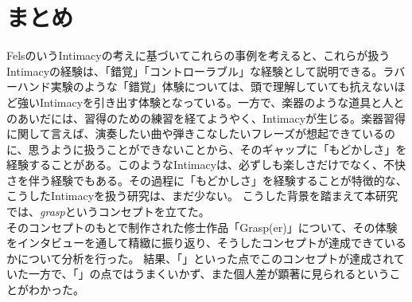 \chapter{まとめ}
FelsのいうIntimacyの考えに基づいてこれらの事例を考えると、これらが扱うIntimacyの経験は、「錯覚」「コントローラブル」な経験として説明できる。ラバーハンド実験のような「錯覚」体験については、頭で理解していても抗えないほど強いIntimacyを引き出す体験となっている。一方で、楽器のような道具と人とのあいだには、習得のための練習を経てようやく、Intimacyが生じる。楽器習得に関して言えば、演奏したい曲や弾きこなしたいフレーズが想起できているのに、思うように扱うことができないことから、そのギャップに「もどかしさ」を経験することがある。このようなIntimacyは、必ずしも楽しさだけでなく、不快さを伴う経験でもある。その過程に「もどかしさ」を経験することが特徴的な、こうしたIntimacyを扱う研究は、まだ少ない。
こうした背景を踏まえて本研究では、\textit{grasp}というコンセプトを立てた。\\
そのコンセプトのもとで制作された修士作品「Grasp(er)」について、その体験をインタビューを通して精緻に振り返り、そうしたコンセプトが達成できているかについて分析を行った。
結果、「」といった点でこのコンセプトが達成されていた一方で、「」の点ではうまくいかず、また個人差が顕著に見られるということがわかった。
